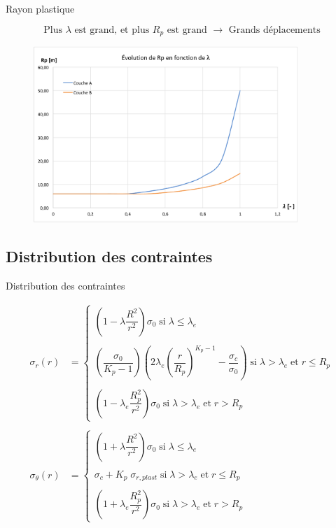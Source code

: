 \documentclass{beamer}
\begin{document}
\begin{frame}{Rayon plastique}

\[\text{Plus $\lambda$ est grand, et plus $R_p$ est grand $\longrightarrow$ Grands déplacements}\]

\begin{figure}
\centering
\includegraphics[width=10cm]{RPlambda.pdf}
\end{figure}
    
\end{frame}

\subsection{Distribution des contraintes}

\begin{frame}{Distribution des contraintes}

\begin{align*}
\sigma_r(r)&=\left\{\begin{array}{l}
\left(1-\lambda\dfrac{R^2}{r^2}\right)\sigma_0\;\text{si}\;\lambda\leq\lambda_e\\\\
\left(\dfrac{\sigma_0}{K_p-1}\right)\left(2\lambda_e\left(\dfrac{r}{R_p}\right)^{K_p-1}-\dfrac{\sigma_c}{\sigma_0}\right)\;\text{si}\;\lambda>\lambda_e\;\text{et}\;r\leq R_p\\\\
\left(1-\lambda_e\dfrac{R_p^2}{r^2}\right)\sigma_0\;\text{si}\;\lambda>\lambda_e\;\text{et}\;r> R_p\end{array}\right.\\\\
\sigma_{\theta}(r)&=\left\{\begin{array}{l}
\left(1+\lambda\dfrac{R^2}{r^2}\right)\sigma_0\;\text{si}\;\lambda\leq\lambda_e\\\\
\sigma_c+K_p\;\sigma_{r,plast}\;\text{si}\;\lambda>\lambda_e\;\text{et}\;r\leq R_p\\\\
\left(1+\lambda_e\dfrac{R_p^2}{r^2}\right)\sigma_0\;\text{si}\;\lambda>\lambda_e\;\text{et}\;r> R_p\end{array}\right.
\end{align*}
\end{frame}
\end{document}
